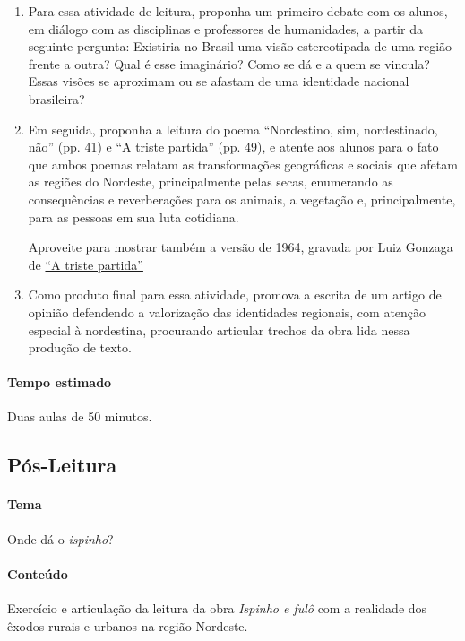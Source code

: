 \documentclass[12pt]{extarticle}
\begin{document}
\begin{enumerate}
\item
Para essa atividade de leitura, proponha um primeiro debate com os alunos,
em diálogo com as disciplinas e professores de humanidades, a partir da seguinte pergunta: 
Existiria no Brasil uma visão estereotipada de uma região frente a outra? 
Qual é esse imaginário? Como se dá e a quem se vincula? Essas visões se aproximam 
ou se afastam de uma identidade nacional brasileira?

\item
Em seguida, proponha a leitura do poema ``Nordestino, sim, nordestinado, não'' (pp. 41) e 
``A triste partida'' (pp. 49), e atente aos alunos para o fato que ambos poemas relatam as 
transformações geográficas e sociais que afetam as regiões do Nordeste, principalmente pelas 
secas, enumerando as consequências e reverberações para os animais, a vegetação e, principalmente, 
para as pessoas em sua luta cotidiana. 

Aproveite para mostrar também a versão de 1964, gravada por Luiz Gonzaga de \href{https://www.youtube.com/watch?v=Yu0bvuK8s_k&ab_channel=EllisStoffel}{``A triste partida''}

\item
Como produto final para essa atividade, promova a escrita de um artigo de opinião 
defendendo a valorização das identidades regionais, com atenção especial à nordestina, 
procurando articular trechos da obra lida nessa produção de texto. 

\end{enumerate}

\paragraph{Tempo estimado} Duas aulas de 50 minutos.  

\subsection{Pós-Leitura}

\paragraph{Tema} Onde dá o \textit{ispinho}?

\paragraph{Conteúdo} Exercício e articulação da leitura da obra \emph{Ispinho e fulô} com a realidade 
dos êxodos rurais e urbanos na região Nordeste.
\end{document}
